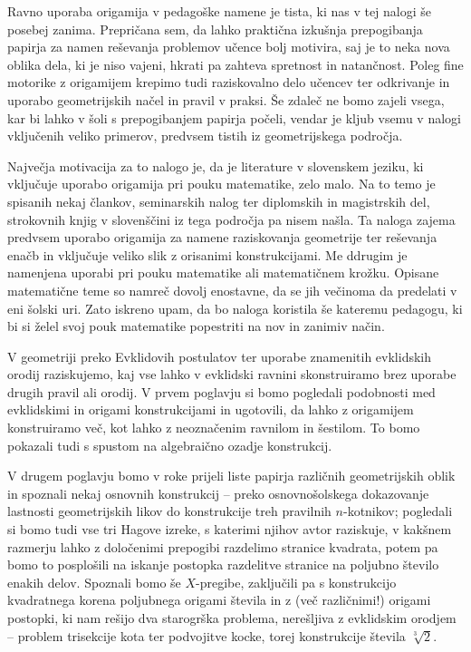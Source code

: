 Ravno uporaba origamija v pedagoške namene je tista, ki nas v tej nalogi še posebej zanima. Prepričana sem, da lahko praktična izkušnja prepogibanja papirja za namen reševanja problemov učence bolj motivira, saj je to neka nova oblika dela, ki je niso vajeni, hkrati pa zahteva spretnost in natančnost. Poleg fine motorike z origamijem krepimo tudi raziskovalno delo učencev ter odkrivanje in uporabo geometrijskih načel in pravil v praksi. Še zdaleč ne bomo zajeli vsega, kar bi lahko v šoli s prepogibanjem papirja počeli, vendar je kljub vsemu v nalogi vključenih veliko primerov, predvsem tistih iz geometrijskega področja.

Največja motivacija za to nalogo je, da je literature v slovenskem jeziku, ki vključuje uporabo origamija pri pouku matematike, zelo malo. Na to temo je spisanih nekaj člankov, seminarskih nalog ter diplomskih in magistrskih del, strokovnih knjig v slovenščini iz tega področja pa nisem našla. Ta naloga zajema predvsem uporabo origamija za namene raziskovanja geometrije ter reševanja enačb in vključuje veliko slik z orisanimi konstrukcijami. Me ddrugim je namenjena uporabi pri pouku matematike ali matematičnem krožku. Opisane matematične teme so namreč dovolj enostavne, da se jih večinoma da predelati v eni šolski uri. Zato iskreno upam, da bo naloga koristila še kateremu pedagogu, ki bi si želel svoj pouk matematike popestriti na nov in zanimiv način.

V geometriji preko Evklidovih postulatov ter uporabe znamenitih evklidskih orodij raziskujemo, kaj vse lahko v evklidski ravnini skonstruiramo brez uporabe drugih pravil ali orodij. V prvem poglavju si bomo pogledali podobnosti med evklidskimi in origami konstrukcijami in ugotovili, da lahko z origamijem konstruiramo več, kot lahko z neoznačenim ravnilom in šestilom. To bomo pokazali tudi s spustom na algebraično ozadje konstrukcij.

V drugem poglavju bomo v roke prijeli liste papirja različnih geometrijskih oblik in spoznali nekaj osnovnih konstrukcij -- preko osnovnošolskega dokazovanje lastnosti geometrijskih likov do konstrukcije treh pravilnih $n$-kotnikov; pogledali si bomo tudi vse tri Hagove izreke, s katerimi njihov avtor raziskuje, v kakšnem razmerju lahko z določenimi prepogibi razdelimo stranice kvadrata, potem pa bomo to posplošili na iskanje postopka razdelitve stranice na poljubno število enakih delov. Spoznali bomo še $X$-pregibe, zaključili pa s konstrukcijo kvadratnega korena poljubnega origami števila in z (več različnimi!) origami postopki, ki nam rešijo dva starogrška problema, nerešljiva z evklidskim orodjem -- problem trisekcije kota ter podvojitve kocke, torej konstrukcije števila $\sqrt[3]{2}$.

